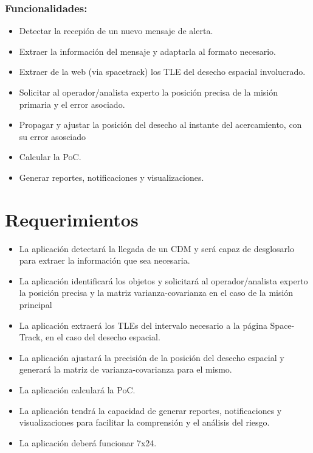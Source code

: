 \subsubsection*{Funcionalidades:}
\begin{itemize}
\item Detectar la recepi\'on de un nuevo mensaje de alerta.\\
\item Extraer la informaci\'on del mensaje y adaptarla al formato necesario.\\
\item Extraer de la web (via spacetrack) los TLE del desecho espacial involucrado.\\
\item Solicitar al operador/analista experto la posici\'on precisa de la misi\'on primaria y el error asociado.\\
\item Propagar y ajustar la posici\'on del desecho al instante del acercamiento, con su error asosciado\\
\item Calcular la PoC.\\
\item Generar reportes, notificaciones y visualizaciones.\\
\end{itemize}

\section{Requerimientos}
\begin{itemize}
\item La aplicaci\'on detectar\'a la llegada de un CDM y ser\'a capaz de desglosarlo para extraer la informaci\'on que sea necesaria.\\
\item La aplicaci\'on identificar\'a los objetos y solicitar\'a al operador/analista experto la posici\'on precisa y la matriz varianza-covarianza en el caso de la misi\'on principal\\
\item La aplicaci\'on extraer\'a los TLEs del intervalo necesario a la p\'agina Space-Track, en el caso del desecho espacial.\\
\item La aplicaci\'on ajustar\'a la precisi\'on de la posici\'on del desecho espacial y generar\'a la matriz de varianza-covarianza para el mismo.\\
\item La aplicaci\'on calcular\'a la PoC.\\
\item La aplicaci\'on tendr\'a la capacidad de generar reportes, notificaciones y visualizaciones para facilitar la comprensi\'on y el an\'alisis del riesgo.
\item La aplicaci\'on deber\'a funcionar 7x24.
\end{itemize}

